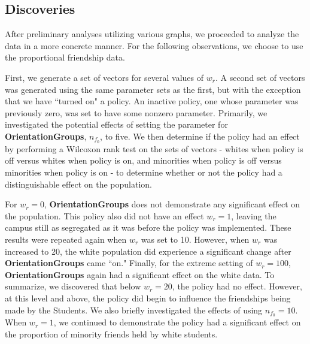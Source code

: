 \subsection{Discoveries}

After preliminary analyses utilizing various graphs, we proceeded to analyze the data in a more concrete manner. For the following observations, we 
choose to use the proportional friendship data.



First, we generate a set of vectors for several values of $w_r$. A second set of vectors was generated using the same parameter sets as the first, but with the 
exception that we have ``turned on" a policy. An inactive policy, one whose parameter was previously zero, was set to have some nonzero parameter. Primarily, 
we investigated the potential effects of setting the parameter for {\bf OrientationGroups}, $n_{f_0}$, to five. We then 
determine if the policy had an effect by performing a Wilcoxon rank test on the sets of vectors - whites when policy is off versus whites when policy is on, and minorities when policy is off 
versus minorities when policy is on - to determine whether or not the policy had a distinguishable effect on the population.

For $w_r=0$, {\bf OrientationGroups} does not demonstrate any significant effect on the population. This policy also did not have an effect $w_r=1$, leaving 
the campus still as segregated as it was before the policy was implemented. These results were repeated again when $w_r$ was set to 10. However, when $w_r$ was increased to 20, the 
white population did experience a significant change after {\bf OrientationGroups} came ``on." Finally, for the extreme setting of $w_r=100$, {\bf OrientationGroups} again had a significant effect on the white data. To summarize, we discovered that below $w_r=20$, the policy had no effect. However, at this level and above, the policy did begin to influence the friendships being made by the Students. We also briefly investigated the effects of using $n_{f_0}=10$. When $w_r=1$, we continued to demonstrate the policy had a significant effect on the proportion of minority friends held by white students.

